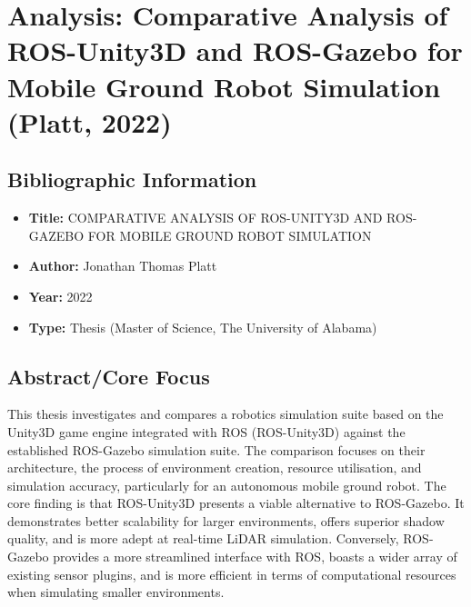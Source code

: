 \section{Analysis: Comparative Analysis of ROS-Unity3D and ROS-Gazebo for Mobile Ground Robot Simulation (Platt, 2022)}\label{sec:structured-summary:-comparative-analysis-of-ros-unity3d-and-ros-gazebo-for-mobile-ground-robot-simulation-(platt-2022)}

\subsection{Bibliographic Information}\label{subsec:bibliographic-information}
\begin{itemize}
    \item \textbf{Title:} COMPARATIVE ANALYSIS OF ROS-UNITY3D AND ROS-GAZEBO FOR MOBILE GROUND ROBOT SIMULATION
    \item \textbf{Author:} Jonathan Thomas Platt
    \item \textbf{Year:} 2022
    \item \textbf{Type:} Thesis (Master of Science, The University of Alabama)
\end{itemize}

\subsection{Abstract/Core Focus}\label{subsec:abstract/core-focus}
This thesis investigates and compares a robotics simulation suite based on the Unity3D game engine integrated with ROS (ROS-Unity3D) against the established ROS-Gazebo simulation suite.
The comparison focuses on their architecture, the process of environment creation, resource utilisation, and simulation accuracy, particularly for an autonomous mobile ground robot.
The core finding is that ROS-Unity3D presents a viable alternative to ROS-Gazebo.
It demonstrates better scalability for larger environments, offers superior shadow quality, and is more adept at real-time LiDAR simulation.
Conversely, ROS-Gazebo provides a more streamlined interface with ROS, boasts a wider array of existing sensor plugins, and is more efficient in terms of computational resources when simulating smaller environments.

